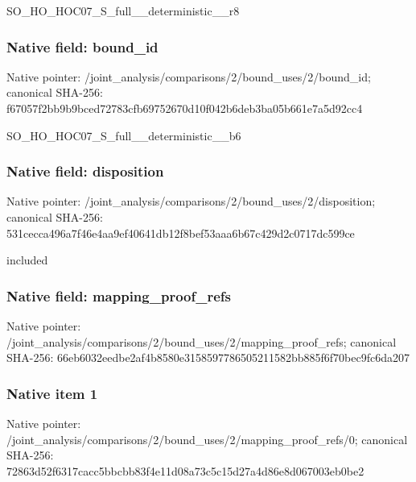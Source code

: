 \documentclass[10pt,a4paper]{article}
\begin{document}
\begingroup\raggedright\sloppy SO\_\allowbreak{}HO\_\allowbreak{}HOC07\_\allowbreak{}S\_\allowbreak{}full\_\allowbreak{}\_\allowbreak{}deterministic\_\allowbreak{}\_\allowbreak{}r8\par\endgroup

\subsubsection{Native field: bound\_\allowbreak{}id}
Native pointer: /joint\_\allowbreak{}analysis/comparisons/2/bound\_\allowbreak{}uses/2/bound\_\allowbreak{}id; canonical SHA-256: f67057f2bb9b9bced72783cfb69752670d10f042b6deb3ba05b661e7a5d92cc4

\begingroup\raggedright\sloppy SO\_\allowbreak{}HO\_\allowbreak{}HOC07\_\allowbreak{}S\_\allowbreak{}full\_\allowbreak{}\_\allowbreak{}deterministic\_\allowbreak{}\_\allowbreak{}b6\par\endgroup

\subsubsection{Native field: disposition}
Native pointer: /joint\_\allowbreak{}analysis/comparisons/2/bound\_\allowbreak{}uses/2/disposition; canonical SHA-256: 531cecca496a7f46e4aa9ef40641db12f8bef53aaa6b67c429d2c0717dc599ce

\begingroup\raggedright\sloppy included\par\endgroup

\subsubsection{Native field: mapping\_\allowbreak{}proof\_\allowbreak{}refs}
Native pointer: /joint\_\allowbreak{}analysis/comparisons/2/bound\_\allowbreak{}uses/2/mapping\_\allowbreak{}proof\_\allowbreak{}refs; canonical SHA-256: 66eb6032eedbe2af4b8580e3158597786505211582bb885f6f70bec9fc6da207

\subsubsection{Native item 1}
Native pointer: /joint\_\allowbreak{}analysis/comparisons/2/bound\_\allowbreak{}uses/2/mapping\_\allowbreak{}proof\_\allowbreak{}refs/0; canonical SHA-256: 72863d52f6317cacc5bbcbb83f4e11d08a73c5c15d27a4d86e8d067003eb0be2
\end{document}
